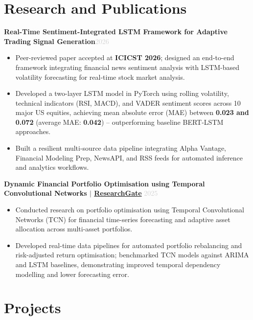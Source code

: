 \documentclass[a4paper,10.5pt]{article}
\newcommand{\resumeProject}[2]{%
  \vspace{3pt}%
  \noindent\textbf{\normalsize #1}\hfill\textcolor{lightgray}{\small #2}%
  \vspace{1pt}%
}
\newcommand{\resumeItem}[1]{%
  \item\small{#1}%
}
\newcommand{\resumeItemListStart}{%
  \begin{itemize}[leftmargin=0.18in, itemsep=2pt, topsep=3pt, parsep=0pt]%
}
\newcommand{\resumeItemListEnd}{%
  \end{itemize}\vspace{2pt}%
}
\begin{document}

\section{Research and Publications}

\resumeProject
  {Real-Time Sentiment-Integrated LSTM Framework for Adaptive Trading Signal Generation}{2026}

\resumeItemListStart
  \resumeItem{
    Peer-reviewed paper accepted at \textbf{ICICST 2026}; designed an end-to-end framework integrating financial news sentiment analysis with LSTM-based volatility forecasting for real-time stock market analysis.
  }
  \resumeItem{
    Developed a two-layer LSTM model in PyTorch using rolling volatility, technical indicators (RSI, MACD), and VADER sentiment scores across 10 major US equities, achieving mean absolute error (MAE) between \textbf{0.023 and 0.072} (average MAE: \textbf{0.042}) -- outperforming baseline BERT-LSTM approaches.
  }
  \resumeItem{
    Built a resilient multi-source data pipeline integrating Alpha Vantage, Financial Modeling Prep, NewsAPI, and RSS feeds for automated inference and analytics workflows.
  }
\resumeItemListEnd

\vspace{4pt}
\resumeProject
  {Dynamic Financial Portfolio Optimisation using Temporal Convolutional Networks 
  $|$ \href{https://www.researchgate.net/publication/394630875_Dynamic_Financial_Portfolio_Optimization_Using_Temporal_Convolutional_Networks_and_Real-Time_Data_Analysis}{ResearchGate} \hfill}{2025}

\resumeItemListStart
  \resumeItem{
    Conducted research on portfolio optimisation using Temporal Convolutional Networks (TCN) for financial time-series forecasting and adaptive asset allocation across multi-asset portfolios.
  }
  \resumeItem{
    Developed real-time data pipelines for automated portfolio rebalancing and risk-adjusted return optimisation; benchmarked TCN models against ARIMA and LSTM baselines, demonstrating improved temporal dependency modelling and lower forecasting error.
  }
\resumeItemListEnd


\section{Projects}
\end{document}
